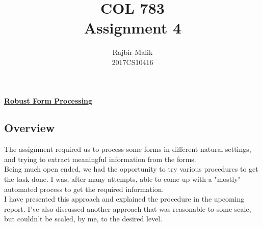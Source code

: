 \documentclass{article}
\title{COL 783 \\ Assignment 4}
\author{Rajbir Malik \\ 2017CS10416}
\begin{document}
    
    \maketitle

    \begin{center}
    \Large{\underline{\textbf{Robust Form Processing}}}
    \end{center}
    \subsection*{Overview}
    The assignment required us to process some forms in different natural settings, and trying to extract meaningful information from the forms.\\
    Being much open ended, we had the opportunity to try various procedures to get the task done. I was, after many attempts, able to come up with a "mostly" automated process to get the required information.\\ I have presented this approach and explained the procedure in the upcoming report. I've also discussed another approach that was reasonable to some scale, but couldn't be scaled, by me, to the desired level.
    \pagebreak
\end{document}
